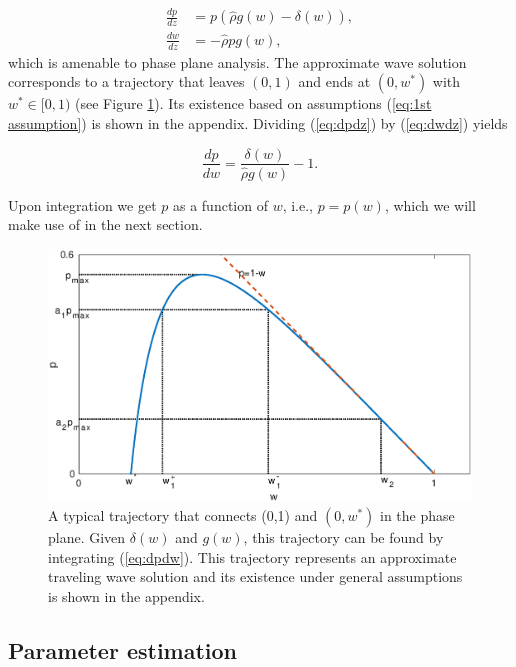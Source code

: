 \documentclass{aims}
\numberwithin{equation}{section}
\begin{document}
\begin{subequations}\label{eq:pp system}
\begin{align}
\frac{dp}{dz} & =p(\hat{\rho}g(w)-\delta(w)),\label{eq:dpdz}\\
\frac{dw}{dz} & =-\hat{\rho}pg(w),\label{eq:dwdz}
\end{align}
\end{subequations}which is amenable to phase plane analysis. The
approximate wave solution corresponds to a trajectory that leaves
$(0,1)$ and ends at $(0,w^{*})$ with $w^{*}\in[0,1)$ (see Figure
\ref{fig:pp}). Its existence based on assumptions (\ref{eq:1st assumption})
is shown in the appendix. Dividing (\ref{eq:dpdz}) by (\ref{eq:dwdz}) yields

\begin{equation} \label{eq:dpdw}
\frac{dp}{dw}=\frac{\delta(w)}{\hat{\rho}g(w)}-1.
\end{equation}

Upon integration we get $p$ as a function of $w$, i.e., $p=p(w)$,
which we will make use of in the next section.

\begin{figure}
\begin{center}
\includegraphics[scale=0.55]{plots/pp.eps}\caption{\label{fig:pp}A typical trajectory that connects (0,1) and $(0,w^*)$ in the phase plane. Given $\delta(w)$ and $g(w)$, this trajectory can be found by integrating (\ref{eq:dpdw}). This trajectory represents an approximate traveling wave solution and its existence under general assumptions is shown in the appendix.}
\end{center}
\end{figure}

\subsection{Parameter estimation}
\end{document}
